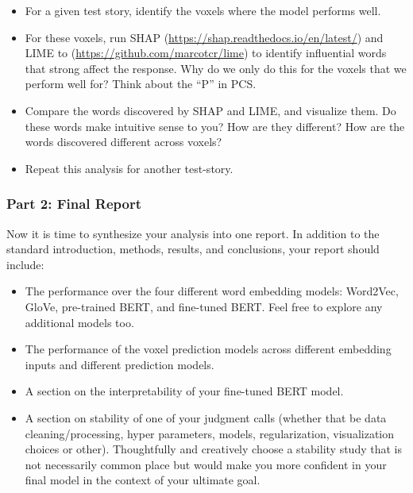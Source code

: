 \documentclass[letterpaper,12pt]{article}
\begin{document}
\begin{itemize}
    \item For a given test story, identify the voxels where the model performs well.
    \item For these voxels, run SHAP (\href{https://shap.readthedocs.io/en/latest/}{https://shap.readthedocs.io/en/latest/}) and LIME to (\href{https://github.com/marcotcr/lime}{https://github.com/marcotcr/lime}) to identify influential words that strong affect the response. Why do we only do this for the voxels that we perform well for? Think about the ``P'' in PCS.
    \item Compare the words discovered by SHAP and LIME, and visualize them. Do these words make intuitive sense to you? How are they different? How are the words discovered different across voxels?
    \item Repeat this analysis for another test-story.
\end{itemize}

\subsubsection{Part 2: Final Report}
Now it is time to synthesize your analysis into one report. In addition to the standard introduction, methods, results, and conclusions, your report should include:

\begin{itemize}
    \item The performance over the four different word embedding models: Word2Vec, GloVe, pre-trained BERT, and fine-tuned BERT. Feel free to explore any additional models too.
    \item The performance of the voxel prediction models across different embedding inputs and different prediction models. 
    \item A section on the interpretability of your fine-tuned BERT model.
    \item A section on stability of one of your judgment calls (whether that be data cleaning/processing, hyper parameters, models, regularization, visualization choices or other). Thoughtfully and creatively choose a stability study that is not necessarily common place but would make you more confident in your final model in the context of your ultimate goal.
\end{itemize}
\end{document}
